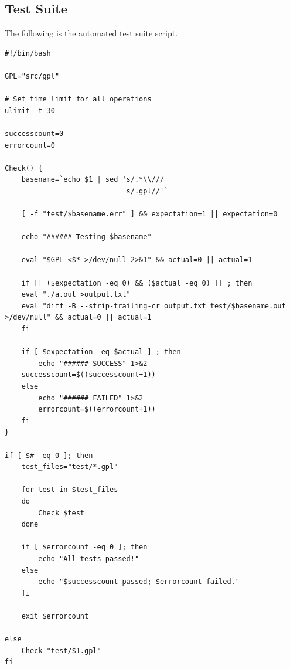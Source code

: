 \documentclass[a4paper,12pt]{article}
\begin{document}
\subsection{Test Suite}
The following is the automated test suite script.
\begin{lstlisting}
#!/bin/bash

GPL="src/gpl"

# Set time limit for all operations
ulimit -t 30

successcount=0
errorcount=0

Check() {
    basename=`echo $1 | sed 's/.*\\///
                             s/.gpl//'`

    [ -f "test/$basename.err" ] && expectation=1 || expectation=0

    echo "###### Testing $basename"

    eval "$GPL <$* >/dev/null 2>&1" && actual=0 || actual=1

    if [[ ($expectation -eq 0) && ($actual -eq 0) ]] ; then
	eval "./a.out >output.txt"
	eval "diff -B --strip-trailing-cr output.txt test/$basename.out >/dev/null" && actual=0 || actual=1
    fi

    if [ $expectation -eq $actual ] ; then
    	echo "###### SUCCESS" 1>&2
	successcount=$((successcount+1))
    else
    	echo "###### FAILED" 1>&2
    	errorcount=$((errorcount+1))
    fi
}

if [ $# -eq 0 ]; then
	test_files="test/*.gpl"

	for test in $test_files
	do
		Check $test
	done

	if [ $errorcount -eq 0 ]; then
	    echo "All tests passed!"
	else
	    echo "$successcount passed; $errorcount failed."
	fi

	exit $errorcount

else
	Check "test/$1.gpl"
fi
\end{lstlisting}
\end{document}
